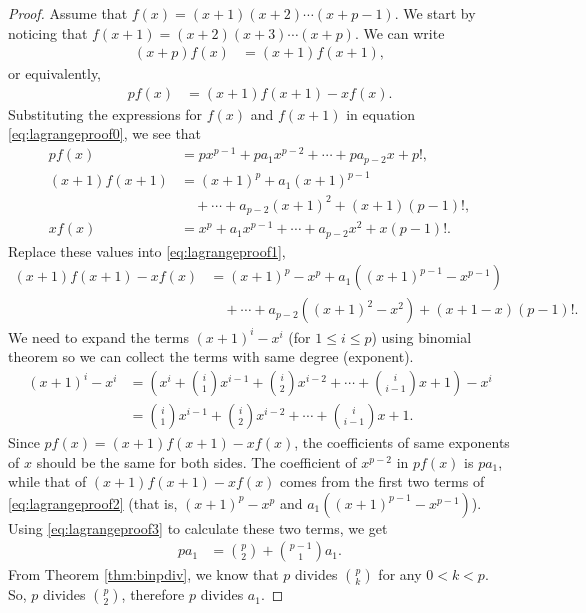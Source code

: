 \documentclass[12pt]{subfile}
\begin{document}
		\begin{proof}[Proof]
			Assume that $f(x)=(x+1)(x+2)\cdots(x+p-1)$. We start by noticing that $f(x+1)  = (x+2) (x+3) \cdots (x+p)$. We can write
				\begin{align*}
					(x+p)f(x) &=(x+1)f(x+1),
				\end{align*}
			or equivalently,
				\begin{align}\label{eq:lagrangeproof1}
					 pf(x) &=(x+1)f(x+1)-xf(x).
				\end{align}
			Substituting the expressions for $f(x)$ and $f(x+1)$ in equation \eqref{eq:lagrangeproof0}, we see that
				\begin{align*}
					pf(x) & = px^{p-1}+pa_1x^{p-2}+\cdots+pa_{p-2}x+p!,\\
					(x+1)f(x+1) & = (x+1)^p+a_1(x+1)^{p-1}\\ & \quad +\cdots+a_{p-2}(x+1)^2+(x+1)(p-1)!,\\
					xf(x) & = x^p+a_1x^{p-1}+\cdots+a_{p-2}x^2+x(p-1)!.
				\end{align*}
			Replace these values into \eqref{eq:lagrangeproof1},
				\begin{align}\label{eq:lagrangeproof2}
					(x+1)f(x+1)-xf(x) & = (x+1)^p-x^p+a_1((x+1)^{p-1}-x^{p-1}) \nonumber\\
					& \quad +\cdots+a_{p-2}((x+1)^2-x^2)+(x+1-x)(p-1)!.
				\end{align}
			We need to expand the terms $(x+1)^i - x^i$ (for $1 \leq i \leq p$) using binomial theorem so we can collect the terms with same degree (exponent).
				\begin{align}\label{eq:lagrangeproof3}
					(x+1)^i-x^i & = \left(x^i+\binom{i}{1}x^{i-1} + \binom{i}{2} x^{i-2}+\cdots+ \binom{i}{i-1} x + 1\right)-x^i \nonumber\\
								& = \binom{i}{1}x^{i-1} + \binom{i}{2} x^{i-2}+\cdots+ \binom{i}{i-1} x + 1.
				\end{align}
			Since $pf(x) = (x+1)f(x+1)-xf(x)$, the coefficients of same exponents of $x$ should be the same for both sides. The coefficient of $x^{p-2}$ in $pf(x)$ is $pa_1$, while that of $(x+1)f(x+1)-xf(x)$ comes from the first two terms of \eqref{eq:lagrangeproof2} (that is, $(x+1)^p-x^p$ and $a_1((x+1)^{p-1}-x^{p-1})$). Using \eqref{eq:lagrangeproof3} to calculate these two terms, we get
				\begin{align*}
					pa_1 & = \binom{p}{2}+\binom{p-1}{1}a_1.
				\end{align*}
			From Theorem \ref{thm:binpdiv}, we know that $p$ divides $\binom{p}{k}$ for any $0<k<p$. So, $p$ divides $\binom{p}{2}$, therefore $p$ divides $a_1$.
			

\end{proof}
\end{document}
